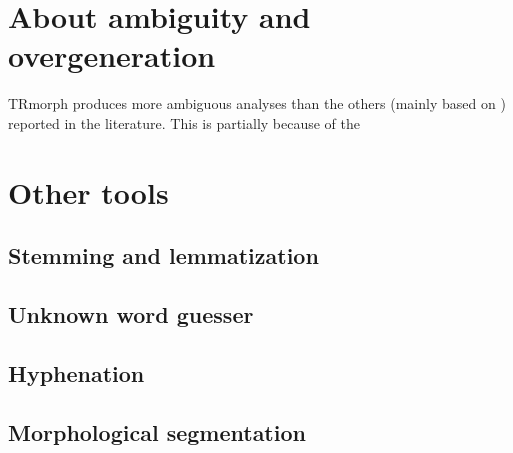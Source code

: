\documentclass[twocolumn]{article}
\begin{document}
\section{About ambiguity and overgeneration}

TRmorph produces more ambiguous analyses than the others (mainly based
on \cite{oflazer1994}) reported in the literature. This is partially
because of the 

\section{\label{sec:other-tools}Other tools}

\subsection{Stemming and lemmatization}

\subsection{Unknown word guesser}

\subsection{Hyphenation}

\subsection{Morphological segmentation}

\printbibliography

\printindex
\end{document}
